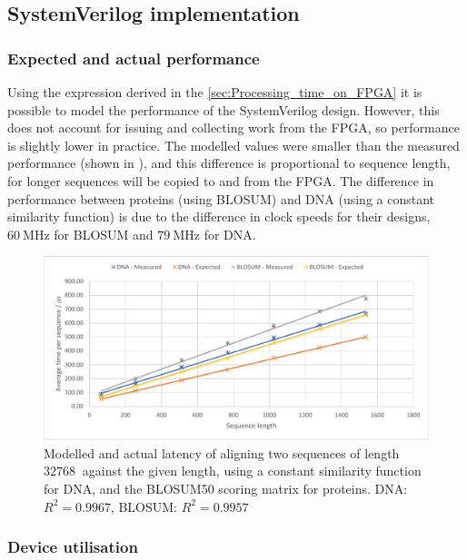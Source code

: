 \subsection{SystemVerilog implementation}
\label{sec:SV_eval}

\subsubsection{Expected and actual performance}
\label{sec:SV_expected_v_actual}

Using the expression derived in the \cref{sec:Processing_time_on_FPGA} it is possible to model the performance of the SystemVerilog design.
However, this does not account for issuing and collecting work from the FPGA, so performance is slightly lower in practice.
The modelled values were smaller than the measured performance (shown in ), and this difference is proportional to sequence length, for longer sequences will be copied to and from the FPGA.
The difference in performance between proteins (using BLOSUM) and DNA (using a constant similarity function) is due to the difference in clock speeds for their designs, $\SI{60}{\mega\hertz}$ for BLOSUM and $\SI{79}{\mega\hertz}$ for DNA.

\begin{figure}
    \centering
    \includegraphics[width=\textwidth]{figs/eval/fpga_all.pdf}
    \caption{Modelled and actual latency of aligning two sequences of length $\SI{32768}{}$ against the given length, using a constant similarity function for DNA, and the BLOSUM50 scoring matrix for proteins. DNA: $R^2=0.9967$, BLOSUM: $R^2=0.9957$}
    \label{fig:FPGA_All}
\end{figure}

\subsubsection{Device utilisation}
\label{sec:FPGA_utilisation}


